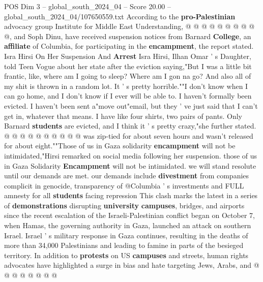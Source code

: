 \begin{textsample}{POS Dim 3 – global\_south\_2024\_04 – Score 20.00 – global\_south\_2024\_04/107650559.txt}
According to the \textbf{pro-Palestinian} advocacy group Institute for Middle East Understanding, @ @ @ @ @ @ @ @ @ @, and Soph Dinu, have received suspension notices from Barnard \textbf{College}, an \textbf{affiliate} of Columbia, for participating in the \textbf{encampment}, the report stated.
Isra Hirsi On Her Suspension And \textbf{Arrest} Isra Hirsi, Ilhan Omar ' s Daughter, told Teen Vogue about her state after the eviction saying,"But I was a little bit frantic, like, where am I going to sleep?
Where am I gon na go?
And also all of my shit is thrown in a random lot.
It ' s pretty horrible.""I don't know when I can go home, and I don't know if I ever will be able to.
I haven't formally been evicted.
I haven't been sent a"move out"email, but they ' ve just said that I can't get in, whatever that means.
I have like four shirts, two pairs of pants.
Only Barnard \textbf{students} are evicted, and I think it ' s pretty crazy,"she further stated. @ @ @ @ @ @ @ @ @ @ was zip-tied for about seven hours and wasn't released for about eight.""Those of us in Gaza solidarity \textbf{encampment} will not be intimidated,"Hirsi remarked on social media following her suspension. those of us in Gaza Solidarity \textbf{Encampment} will not be intimidated. we will stand resolute until our demands are met. our demands include \textbf{divestment} from companies complicit in genocide, transparency of @Columbia ' s investments and FULL amnesty for all \textbf{students} facing repression This clash marks the latest in a series of \textbf{demonstrations} disrupting \textbf{university} \textbf{campuses}, bridges, and airports since the recent escalation of the Israeli-Palestinian conflict began on October 7, when Hamas, the governing authority in Gaza, launched an attack on southern Israel.
Israel ' s military response in Gaza continues, resulting in the deaths of more than 34,000 Palestinians and leading to famine in parts of the besieged territory.
In addition to \textbf{protests} on US \textbf{campuses} and streets, human rights advocates have highlighted a surge in bias and hate targeting Jews, Arabs, and @ @ @ @ @ @ @ @

\end{textsample}
